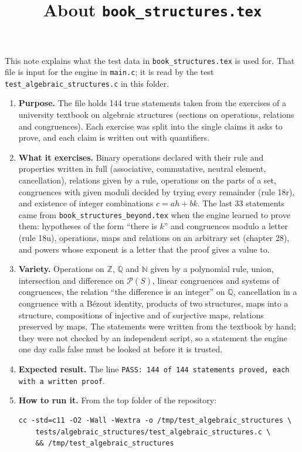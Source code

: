 \documentclass[11pt,a4paper]{article}
\title{About \texttt{book\_structures.tex}}
\author{}
\date{}
\begin{document}
\maketitle
This note explains what the test data in \texttt{book\_structures.tex} is used for. That file is input for the engine in \texttt{main.c}; it is read by the test \texttt{test\_algebraic\_structures.c} in this folder.

\begin{enumerate}
\item \textbf{Purpose.} The file holds 144 true statements taken from the exercises of a university textbook on algebraic structures (sections on operations, relations and congruences). Each exercise was split into the single claims it asks to prove, and each claim is written out with quantifiers.

\item \textbf{What it exercises.} Binary operations declared with their rule and properties written in full (associative, commutative, neutral element, cancellation), relations given by a rule, operations on the parts of a set, congruences with given moduli decided by trying every remainder (rule 18r), and existence of integer combinations $c = ah + bk$. The last 33 statements came from \texttt{book\_structures\_beyond.tex} when the engine learned to prove them: hypotheses of the form ``there is $k$'' and congruences modulo a letter (rule 18u), operations, maps and relations on an arbitrary set (chapter 28), and powers whose exponent is a letter that the proof gives a value to.

\item \textbf{Variety.} Operations on $\mathbb{Z}$, $\mathbb{Q}$ and $\mathbb{N}$ given by a polynomial rule, union, intersection and difference on $\mathcal{P}(S)$, linear congruences and systems of congruences, the relation ``the difference is an integer'' on $\mathbb{Q}$, cancellation in a congruence with a B\'ezout identity, products of two structures, maps into a structure, compositions of injective and of surjective maps, relations preserved by maps. The statements were written from the textbook by hand; they were not checked by an independent script, so a statement the engine one day calls false must be looked at before it is trusted.

\item \textbf{Expected result.} The line \texttt{PASS: 144 of 144 statements proved, each with a written proof}.

\item \textbf{How to run it.} From the top folder of the repository:
\begin{verbatim}
cc -std=c11 -O2 -Wall -Wextra -o /tmp/test_algebraic_structures \
    tests/algebraic_structures/test_algebraic_structures.c \
    && /tmp/test_algebraic_structures
\end{verbatim}
\end{enumerate}
\end{document}
